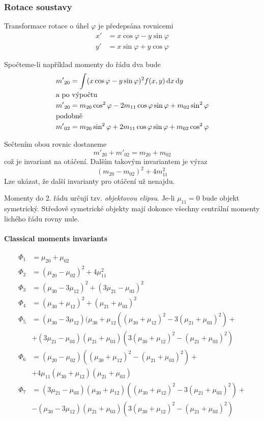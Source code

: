 \subsubsection{Rotace soustavy}
Transformace rotace o úhel $\varphi$ je předepsána rovnicemi
\begin{align}
x' &= x\cos\varphi-y\sin\varphi\nonumber\\
y' &= x\sin\varphi+y\cos\varphi
\end{align}

Spočteme-li například momenty do řádu dva bude
\begin{align}
{m'}_{20} &= \int(x\cos\varphi-y\sin\varphi)^2f(x,y)\dif x\dif y\\
\noalign{\hbox{a po výpočtu}\nonumber}
{m'}_{20} &= m_{20}\cos^2\varphi-2m_{11}\cos\varphi\sin\varphi +m_{02}\sin^2\varphi \\
\noalign{\hbox{podobně}\nonumber}
{m'}_{02} &= m_{20}\sin^2\varphi+2m_{11}\cos\varphi\sin\varphi +m_{02}\cos^2\varphi 
\end{align}

\noindent Sečtením obou rovnic dostaneme
\begin{equation}
{m'}_{20}+{m'}_{02}=m_{20}+m_{02}
\end{equation}
\noindent což je invariant na otáčení. Dalším takovým invariantem je výraz
\begin{equation}
(m_{20}-m_{02})^2+4m^2_{11}
\end{equation}
Lze ukázat, že další invarianty pro otáčení už nenajdu.

Momenty do 2. řádu určují tzv. \emph{objektovou elipsu}. Je-li $\mu_{11}=0$ bude objekt symetrický.
Středově symetrické objekty mají dokonce všechny centrální momenty lichého řádu rovny nule.

\paragraph{Classical moments invariants}
\begin{align}
\Phi_1 &= \mu_{20}+\mu_{02}\\
\Phi_2 &= (\mu_{20}-\mu_{02})^2+4\mu^2_{11}\\
\Phi_3 &= (\mu_{30}-3\mu_{12})^2+(3\mu_{21}-\mu_{03})^2\\
\Phi_4 &= (\mu_{30}+\mu_{12})^2+(\mu_{21}+\mu_{03})^2\\
\Phi_5 &= (\mu_{30}-3\mu_{12})(\mu_{30}+\mu_{12}((\mu_{30}+\mu_{12})^2-3(\mu_{21}+\mu_{03})^2)+\nonumber\\
&+(3\mu_{21}-\mu_{03})(\mu_{21}+\mu_{03})(3(\mu_{30}+\mu_{12})^2-(\mu_{21}+\mu_{03})^2)\\
\Phi_6 &= (\mu_{20}-\mu_{02})((\mu_{30}+\mu_{12})^2-(\mu_{21}+\mu_{03})^2)+\nonumber\\
&+4\mu_{11}(\mu_{30}+\mu_{12})(\mu_{21}+\mu_{03})\\
\Phi_7 &= (3\mu_{21}-\mu_{03})(\mu_{30}+\mu_{12})((\mu_{30}+\mu_{12})^2-3(\mu_{21}+\mu_{03})^2)+\nonumber\\
&-(\mu_{30}-3\mu_{12})(\mu_{21}+\mu_{03})(3(\mu_{30}+\mu_{12})^2-(\mu_{21}+\mu_{03})^2)
\end{align}

